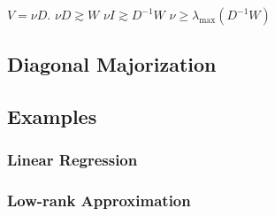 \documentclass[
  12pt,
  letterpaper,
  DIV=11,
  numbers=noendperiod]{scrartcl}
\begin{document}
\(V=\nu D\). \(\nu D\gtrsim W\) \(\nu I\gtrsim D^{-1}W\)
\(\nu\geq\lambda_{\text{max}}(D^{-1}W)\)

\subsection{Diagonal Majorization}\label{diagonal-majorization}

\subsection{Examples}\label{examples}

\subsubsection{Linear Regression}\label{linear-regression}

\subsubsection{Low-rank Approximation}\label{low-rank-approximation}
\end{document}
